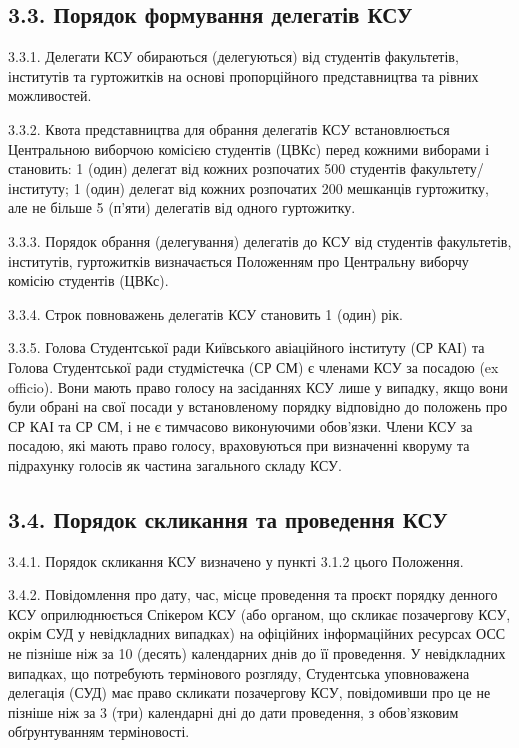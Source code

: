 \subsection*{3.3. Порядок формування делегатів КСУ}
    3.3.1. Делегати КСУ обираються (делегуються) від студентів факультетів, інститутів та гуртожитків на основі пропорційного представництва та рівних можливостей.

    3.3.2. Квота представництва для обрання делегатів КСУ встановлюється Центральною виборчою комісією студентів (ЦВКс) перед кожними виборами і становить: 1 (один) делегат від кожних розпочатих 500 студентів факультету/інституту; 1 (один) делегат від кожних розпочатих 200 мешканців гуртожитку, але не більше 5 (п'яти) делегатів від одного гуртожитку.

    3.3.3. Порядок обрання (делегування) делегатів до КСУ від студентів факультетів, інститутів, гуртожитків визначається Положенням про Центральну виборчу комісію студентів (ЦВКс).

    3.3.4. Строк повноважень делегатів КСУ становить 1 (один) рік.

    3.3.5. Голова Студентської ради Київського авіаційного інституту (СР КАІ) та Голова Студентської ради студмістечка (СР СМ) є членами КСУ за посадою (ex officio). Вони мають право голосу на засіданнях КСУ лише у випадку, якщо вони були обрані на свої посади у встановленому порядку відповідно до положень про СР КАІ та СР СМ, і не є тимчасово виконуючими обов'язки. Члени КСУ за посадою, які мають право голосу, враховуються при визначенні кворуму та підрахунку голосів як частина загального складу КСУ.

\subsection*{3.4. Порядок скликання та проведення КСУ}
    3.4.1. Порядок скликання КСУ визначено у пункті 3.1.2 цього Положення.

    3.4.2. Повідомлення про дату, час, місце проведення та проєкт порядку денного КСУ оприлюднюється Спікером КСУ (або органом, що скликає позачергову КСУ, окрім СУД у невідкладних випадках) на офіційних інформаційних ресурсах ОСС не пізніше ніж за 10 (десять) календарних днів до її проведення. У невідкладних випадках, що потребують термінового розгляду, Студентська уповноважена делегація (СУД) має право скликати позачергову КСУ, повідомивши про це не пізніше ніж за 3 (три) календарні дні до дати проведення, з обов'язковим обґрунтуванням терміновості.

